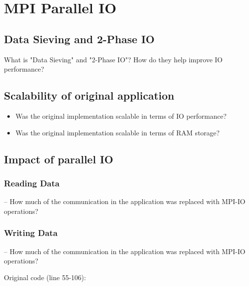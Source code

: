 \documentclass[9pt,pdftex,xcolor=dvipsnames]{beamer}
\begin{document}
\section{MPI Parallel IO}
\begin{frame}{\phantom{Contents}}
\tableofcontents[
  currentsection  
]
\end{frame}


\subsection{Data Sieving and 2-Phase IO}
\begin{frame}{\insertsubsection}
What is "Data Sieving" and "2-Phase IO"? How do they help improve IO performance?
\end{frame}


\subsection{Scalability of original application}
\begin{frame}{\insertsubsection}
\begin{itemize}
\item Was the original implementation scalable in terms of IO performance?
\item Was the original implementation scalable in terms of RAM storage?
\end{itemize}
\end{frame}


\subsection{Impact of parallel IO}

\subsubsection{Reading Data}
\begin{frame}[fragile]{\insertsubsection--\insertsubsubsection}
How much of the communication in the application was replaced with MPI-IO operations? \\
\end{frame}

\subsubsection{Writing Data}
\begin{frame}[fragile]{\insertsubsection--\insertsubsubsection}
How much of the communication in the application was replaced with MPI-IO operations? \\
\begin{block}{Original code (line 55-106):}
\ioMPICodeWrite
\end{block}
\end{frame}
\end{document}
